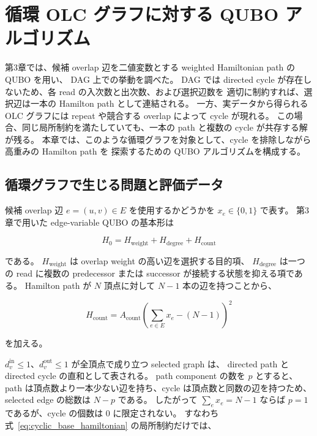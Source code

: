 \section{循環 OLC グラフに対する QUBO アルゴリズム}

第3章では、候補 overlap 辺を二値変数とする weighted Hamiltonian path の QUBO を用い、
DAG 上での挙動を調べた。
DAG では directed cycle が存在しないため、各 read の入次数と出次数、および選択辺数を
適切に制約すれば、選択辺は一本の Hamilton path として連結される。
一方、実データから得られる OLC グラフには repeat や競合する overlap によって cycle が現れる。
この場合、同じ局所制約を満たしていても、一本の path と複数の cycle が共存する解が残る。
本章では、このような循環グラフを対象として、cycle を排除しながら高重みの Hamilton path を
探索するための QUBO アルゴリズムを構成する。

\subsection{循環グラフで生じる問題と評価データ}

候補 overlap 辺 $e=(u,v)\in E$ を使用するかどうかを
$x_e\in\{0,1\}$ で表す。
第3章で用いた edge-variable QUBO の基本形は

\begin{equation}
H_0
=
H_{\mathrm{weight}}
+
H_{\mathrm{degree}}
+
H_{\mathrm{count}}
\label{eq:cyclic_base_hamiltonian}
\end{equation}

である。
$H_{\mathrm{weight}}$ は overlap weight の高い辺を選択する目的項、
$H_{\mathrm{degree}}$ は一つの read に複数の predecessor または successor が接続する状態を抑える項である。
Hamilton path が $N$ 頂点に対して $N-1$ 本の辺を持つことから、

\begin{equation}
H_{\mathrm{count}}
=
A_{\mathrm{count}}
\left(
\sum_{e\in E}x_e-(N-1)
\right)^2
\label{eq:cyclic_count_constraint}
\end{equation}

を加える。

$d_v^{\mathrm{in}}\leq 1$、$d_v^{\mathrm{out}}\leq 1$ が全頂点で成り立つ selected graph は、
directed path と directed cycle の直和として表される。
path component の数を $p$ とすると、path は頂点数より一本少ない辺を持ち、cycle は頂点数と同数の辺を持つため、
selected edge の総数は $N-p$ である。
したがって $\sum_e x_e=N-1$ ならば $p=1$ であるが、cycle の個数は 0 に限定されない。
すなわち式~\eqref{eq:cyclic_base_hamiltonian} の局所制約だけでは、

